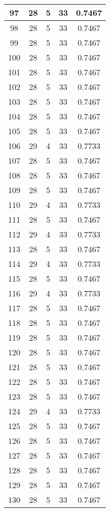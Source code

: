\documentclass[letterpaper, 12pt]{article}
\begin{document}
\begin{longtable}{|c|c|c|c|c|}
\hline
97 & 28 & 5 & 33 & 0.7467 \\
\hline
98 & 28 & 5 & 33 & 0.7467 \\
\hline
99 & 28 & 5 & 33 & 0.7467 \\
\hline
100 & 28 & 5 & 33 & 0.7467 \\
\hline
101 & 28 & 5 & 33 & 0.7467 \\
\hline
102 & 28 & 5 & 33 & 0.7467 \\
\hline
103 & 28 & 5 & 33 & 0.7467 \\
\hline
104 & 28 & 5 & 33 & 0.7467 \\
\hline
105 & 28 & 5 & 33 & 0.7467 \\
\hline
106 & 29 & 4 & 33 & 0.7733 \\
\hline
107 & 28 & 5 & 33 & 0.7467 \\
\hline
108 & 28 & 5 & 33 & 0.7467 \\
\hline
109 & 28 & 5 & 33 & 0.7467 \\
\hline
110 & 29 & 4 & 33 & 0.7733 \\
\hline
111 & 28 & 5 & 33 & 0.7467 \\
\hline
112 & 29 & 4 & 33 & 0.7733 \\
\hline
113 & 28 & 5 & 33 & 0.7467 \\
\hline
114 & 29 & 4 & 33 & 0.7733 \\
\hline
115 & 28 & 5 & 33 & 0.7467 \\
\hline
116 & 29 & 4 & 33 & 0.7733 \\
\hline
117 & 28 & 5 & 33 & 0.7467 \\
\hline
118 & 28 & 5 & 33 & 0.7467 \\
\hline
119 & 28 & 5 & 33 & 0.7467 \\
\hline
120 & 28 & 5 & 33 & 0.7467 \\
\hline
121 & 28 & 5 & 33 & 0.7467 \\
\hline
122 & 28 & 5 & 33 & 0.7467 \\
\hline
123 & 28 & 5 & 33 & 0.7467 \\
\hline
124 & 29 & 4 & 33 & 0.7733 \\
\hline
125 & 28 & 5 & 33 & 0.7467 \\
\hline
126 & 28 & 5 & 33 & 0.7467 \\
\hline
127 & 28 & 5 & 33 & 0.7467 \\
\hline
128 & 28 & 5 & 33 & 0.7467 \\
\hline
129 & 28 & 5 & 33 & 0.7467 \\
\hline
130 & 28 & 5 & 33 & 0.7467 \\

\end{longtable}
\end{document}
